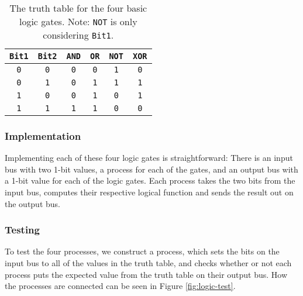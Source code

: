 \begin{table}
    \centering
    \begin{tabular}{cc|cccc}
        \toprule
        \texttt{Bit1} & \texttt{Bit2} & \texttt{AND} & \texttt{OR} &
        \texttt{NOT} & \texttt{XOR} \\
        \midrule
        \texttt{0} & \texttt{0} & \texttt{0} & \texttt{0} & \texttt{1} &
            \texttt{0} \\
        \texttt{0} & \texttt{1} & \texttt{0} & \texttt{1} & \texttt{1} &
            \texttt{1} \\
        \texttt{1} & \texttt{0} & \texttt{0} & \texttt{1} & \texttt{0} &
            \texttt{1} \\
        \texttt{1} & \texttt{1} & \texttt{1} & \texttt{1} & \texttt{0} &
            \texttt{0} \\
        \bottomrule
    \end{tabular}
    \caption{The truth table for the four basic logic gates. Note: \texttt{NOT}
    is only considering \texttt{Bit1}.}
    \label{tab:truth-table}
\end{table}

\subsubsection*{Implementation}
Implementing each of these four logic gates is straightforward: There is an
input bus with two 1-bit values, a process for each of the gates, and an output
bus with a 1-bit value for each of the logic gates. Each process takes the two
bits from the input bus, computes their respective logical function and sends
the result out on the output bus.
%

\subsubsection*{Testing}
To test the four processes, we construct a process, which sets the bits on the
input bus to all of the values in the truth table, and checks whether or not
each process puts the expected value from the truth table on their output bus.
How the processes are connected can be seen in Figure \ref{fig:logic-test}.

